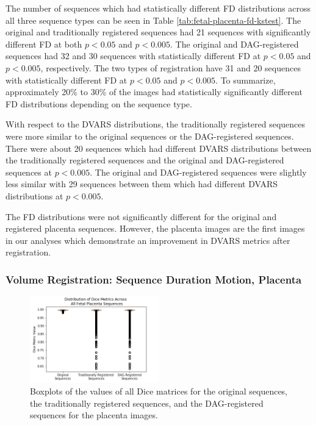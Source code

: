 The number of sequences which had statistically different FD distributions across all three sequence types can be seen in Table \ref{tab:fetal-placenta-fd-kstest}. The original and traditionally registered sequences had 21 sequences with significantly different FD at both $p < 0.05$ and $p < 0.005$. The original and DAG-registered sequences had 32 and 30 sequences with statistically different FD at $p < 0.05$ and $p < 0.005$, respectively. The two types of registration have 31 and 20 sequences with statistically different FD at $p < 0.05$ and $p < 0.005$. To summarize, approximately 20\% to 30\% of the images had statistically significantly different FD distributions depending on the sequence type.

With respect to the DVARS distributions, the traditionally registered sequences were more similar to the original sequences or the DAG-registered sequences. There were about 20 sequences which had different DVARS distributions between the traditionally registered sequences and the original and DAG-registered sequences at $p < 0.005$. The original and DAG-registered sequences were slightly less similar with 29 sequences between them which had different DVARS distributions at $p < 0.005$.

The FD distributions were not significantly different for the original and registered placenta sequences. However, the placenta images are the first images in our analyses which demonstrate an improvement in DVARS metrics after registration.

\subsubsection{Volume Registration: Sequence Duration Motion, Placenta}

\begin{figure}
\centering
\includegraphics[width=0.5\textwidth]{6/figures/fetal-placenta-dice-box.png}
\caption{Boxplots of the values of all Dice matrices for the original sequences, the traditionally registered sequences, and the DAG-registered sequences for the placenta images.}
\label{fig:fetal-placenta-dice-box}
\end{figure}

